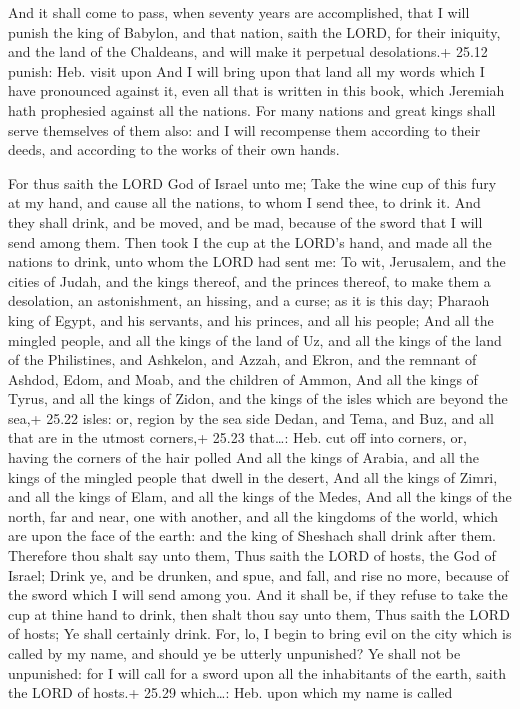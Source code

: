  And it shall come to pass, when seventy years are
accomplished, that I will punish the king of Babylon, and that nation,
saith the LORD, for their iniquity, and the land of the Chaldeans, and
will make it perpetual desolations.+ 25.12 punish: Heb. visit upon
 And I will bring upon that land all my words which I have
pronounced against it, even all that is written in this book, which
Jeremiah hath prophesied against all the nations.  For many
nations and great kings shall serve themselves of them also: and I will
recompense them according to their deeds, and according to the works of
their own hands.

 For thus saith the LORD God of Israel unto me; Take the
wine cup of this fury at my hand, and cause all the nations, to whom I
send thee, to drink it.  And they shall drink, and be
moved, and be mad, because of the sword that I will send among them.
 Then took I the cup at the LORD's hand, and made all the
nations to drink, unto whom the LORD had sent me:  To wit,
Jerusalem, and the cities of Judah, and the kings thereof, and the
princes thereof, to make them a desolation, an astonishment, an hissing,
and a curse; as it is this day;  Pharaoh king of Egypt, and
his servants, and his princes, and all his people;  And all
the mingled people, and all the kings of the land of Uz, and all the
kings of the land of the Philistines, and Ashkelon, and Azzah, and
Ekron, and the remnant of Ashdod,  Edom, and Moab, and the
children of Ammon,  And all the kings of Tyrus, and all the
kings of Zidon, and the kings of the isles which are beyond the sea,+
25.22 isles: or, region by the sea side  Dedan, and Tema,
and Buz, and all that are in the utmost corners,+ 25.23 that\ldots: Heb.
cut off into corners, or, having the corners of the hair polled
 And all the kings of Arabia, and all the kings of the
mingled people that dwell in the desert,  And all the kings
of Zimri, and all the kings of Elam, and all the kings of the Medes,
 And all the kings of the north, far and near, one with
another, and all the kingdoms of the world, which are upon the face of
the earth: and the king of Sheshach shall drink after them.
 Therefore thou shalt say unto them, Thus saith the LORD of
hosts, the God of Israel; Drink ye, and be drunken, and spue, and fall,
and rise no more, because of the sword which I will send among you.
 And it shall be, if they refuse to take the cup at thine
hand to drink, then shalt thou say unto them, Thus saith the LORD of
hosts; Ye shall certainly drink.  For, lo, I begin to bring
evil on the city which is called by my name, and should ye be utterly
unpunished? Ye shall not be unpunished: for I will call for a sword upon
all the inhabitants of the earth, saith the LORD of hosts.+ 25.29
which\ldots: Heb. upon which my name is called

